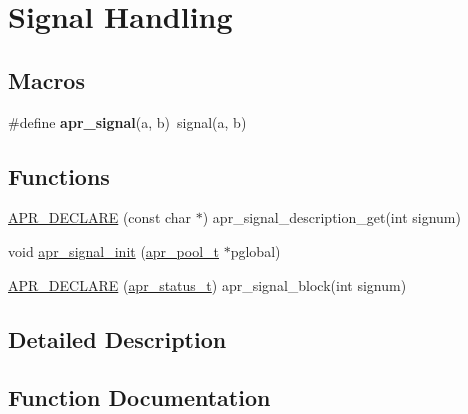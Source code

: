 \hypertarget{group__apr__signal}{}\section{Signal Handling}
\label{group__apr__signal}
\subsection*{Macros}
\begin{DoxyCompactItemize}
\item 
\mbox{\label{group__apr__signal_ga9f04335dbae5e17171e87c7bcb6810f8}} 
\#define {\bfseries apr\+\_\+signal}(a,  b)~signal(a, b)
\end{DoxyCompactItemize}
\subsection*{Functions}
\begin{DoxyCompactItemize}
\item 
\mbox{\hyperlink{group__apr__signal_gaed88b5cf42dcc966a95840f0575380bc}{A\+P\+R\+\_\+\+D\+E\+C\+L\+A\+RE}} (const char $\ast$) apr\+\_\+signal\+\_\+description\+\_\+get(int signum)
\item 
void \mbox{\hyperlink{group__apr__signal_ga76f1701a2f33697425b3fa6fa44a192b}{apr\+\_\+signal\+\_\+init}} (\mbox{\hyperlink{group__apr__pools_gaf137f28edcf9a086cd6bc36c20d7cdfb}{apr\+\_\+pool\+\_\+t}} $\ast$pglobal)
\item 
\mbox{\hyperlink{group__apr__signal_ga907565140ae0dda6f562a679e6519e67}{A\+P\+R\+\_\+\+D\+E\+C\+L\+A\+RE}} (\mbox{\hyperlink{group__apr__errno_gaf76ee4543247e9fb3f3546203e590a6c}{apr\+\_\+status\+\_\+t}}) apr\+\_\+signal\+\_\+block(int signum)
\end{DoxyCompactItemize}


\subsection{Detailed Description}


\subsection{Function Documentation}
\mbox{\label{group__apr__signal_gaed88b5cf42dcc966a95840f0575380bc}} 
